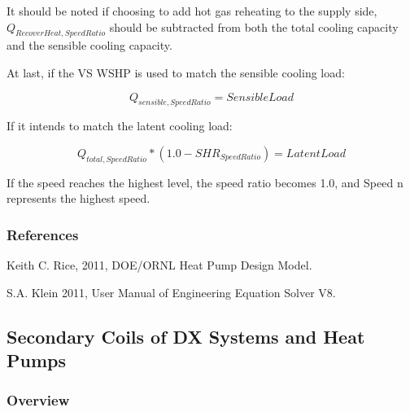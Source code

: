 It should be noted if choosing to add hot gas reheating to the supply side, \({Q_{RecoverHeat,SpeedRatio}}\) should be subtracted from both the total cooling capacity and the sensible cooling capacity.

At last, if the VS WSHP is used to match the sensible cooling load:

\begin{equation}
{Q_{sensible,SpeedRatio}} = SensibleLoad
\end{equation}

If it intends to match the latent cooling load:

\begin{equation}
{Q_{total,SpeedRatio}}*\left( {1.0 - SH{R_{SpeedRatio}}} \right) = LatentLoad
\end{equation}

If the speed reaches the highest level, the speed ratio becomes 1.0, and Speed n represents the highest speed.

\subsubsection{References}\label{references-9}

Keith C. Rice, 2011, DOE/ORNL Heat Pump Design Model.

S.A. Klein 2011, User Manual of Engineering Equation Solver V8.

\subsection{Secondary Coils of DX Systems and Heat Pumps}\label{secondary-coils-of-dx-systems-and-heat-pumps}

\subsubsection{Overview}\label{overview-15}

